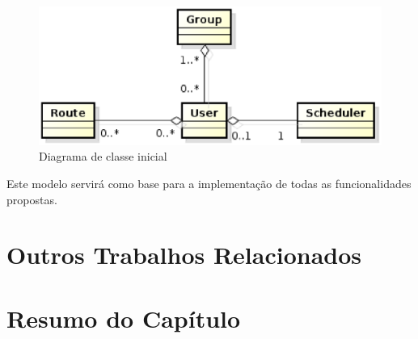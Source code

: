 \begin{figure}[!h]
	\centering
	\includegraphics[scale=0.55]{figuras/capitulo5/diagrama_classe.eps}
	\caption{Diagrama de classe inicial}
	\label{diagrama de classe}
\end{figure}

Este modelo servirá como base para a implementação de todas as funcionalidades propostas.

\section{Outros Trabalhos Relacionados}

\section{Resumo do Capítulo}
